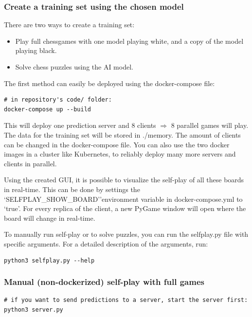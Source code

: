 \documentclass{article}
\begin{document}
\subsubsection{Create a training set using the chosen model}

There are two ways to create a training set:

\begin{itemize}
	\item Play full chessgames with one model playing white, and a copy of the model playing black.
	\item Solve chess puzzles using the AI model.
\end{itemize}

The first method can easily be deployed using the docker-compose file:

\begin{verbatim}
# in repository's code/ folder:
docker-compose up --build
\end{verbatim}

This will deploy one prediction server and 8 clients $\Rightarrow$ 8 parallel games will play. 
The data for the training set will be stored in ./memory.
The amount of clients can be changed in the docker-compose file. 
You can also use the two docker images in a cluster like Kubernetes, to
reliably deploy many more servers and clients in parallel.

Using the created GUI, it is possible to visualize the self-play of all these boards in real-time.
This can be done by settings the `SELFPLAY\_SHOW\_BOARD''environment variable in docker-compose.yml to `true'.
For every replica of the client, a new PyGame window will open where the board will change in real-time. 

To manually run self-play or to solve puzzles, you can run the selfplay.py file 
with specific arguments. For a detailed description of the arguments, run:

\begin{verbatim}
python3 selfplay.py --help
\end{verbatim}

\subsubsection{Manual (non-dockerized) self-play with full games}

\begin{verbatim}
# if you want to send predictions to a server, start the server first:
python3 server.py
\end{verbatim}
\end{document}
